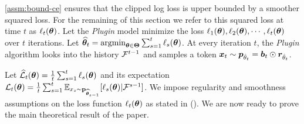\cref{assm:bound-ce} ensures that the clipped log loss is upper bounded by a smoother squared loss. For the remaining of this section we refer to this squared loss at time $t$ as $\ell_t(\bm{\theta})$.
%
Let the \textit{Plugin} model minimize the loss $\ell_{1}(\bm{\theta}), \ell_{2}(\bm{\theta}), \cdots, \ell_{t}(\bm{\theta})$ over $t$ iterations. Let ${\widehat{\bm{\theta}}}_t =\operatorname*{argmin}_{\bm{\theta} \in \bm{\Theta}} \sum_{s = 1}^t \ell_{s}(\bm{\theta})$. 
%
At every iteration $t$, the \textit{Plugin} algorithm looks into the history $\mathcal{F}^{t-1}$ and samples a token $\bm{x}_t\sim \bm{p}_{\hat \theta_t}=\bm{b}_t \odot \bm{r}_{\hat \theta_t}$. 

Let $\widehat{\cal L}_t(\bm{\theta}) = \frac{1}{t}\sum_{s=1}^t \ell_{s}(\bm{\theta})$ and its expectation ${\cal L}_t(\bm{\theta}) = \frac{1}{t}\sum_{s=1}^t\mathbb{E}_{x_s\sim \mathbf{p}_{{\widehat{\bm{\theta}}}_{s-1}}}[\ell_s(\bm{\theta})|\mathcal{F}^{s-1}]$.
%
We impose regularity and smoothness assumptions on the loss function $\ell_t(\bm{\theta})$ as stated in  (). We are now ready to prove the main theoretical result of the paper.



%
%






